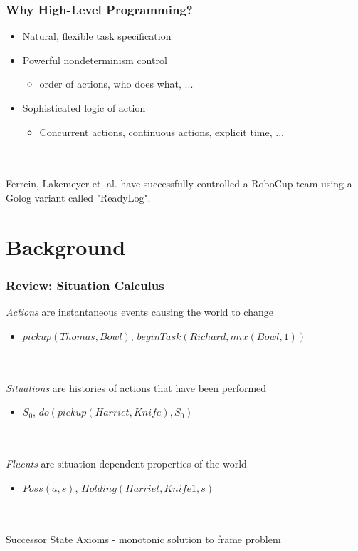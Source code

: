 \documentclass[compress]{beamer}
\begin{document}
\begin{frame}
\frametitle{Why High-Level Programming?}
\begin{itemize}
\item Natural, flexible task specification
\item Powerful nondeterminism control
  \begin{itemize}
  \item order of actions, who does what, ...
  \end{itemize}
\item Sophisticated logic of action
  \begin{itemize}
  \item Concurrent actions, continuous actions, explicit time, ...
  \end{itemize}
\end{itemize}
\ \\
\ \\
Ferrein, Lakemeyer et. al. have successfully controlled a RoboCup team using
a Golog variant called "ReadyLog".
\end{frame}


\section{Background}

\begin{frame}
\frametitle{Review: Situation Calculus}
\emph{Actions} are instantaneous events causing the world to change
\begin{itemize}
  \item $pickup(Thomas,Bowl)$, $beginTask(Richard,mix(Bowl,1))$
\end{itemize}
\ \\
\ \\
\emph{Situations} are histories of actions that have been performed
\begin{itemize}
  \item $S_0$, $do(pickup(Harriet,Knife),S_0)$
\end{itemize}
\ \\
\ \\
\emph{Fluents} are situation-dependent properties of the world
\begin{itemize}
  \item $Poss(a,s)$, $Holding(Harriet,Knife1,s)$
\end{itemize}
\ \\
\ \\
Successor State Axioms - monotonic solution to frame problem
\end{frame}
\end{document}
